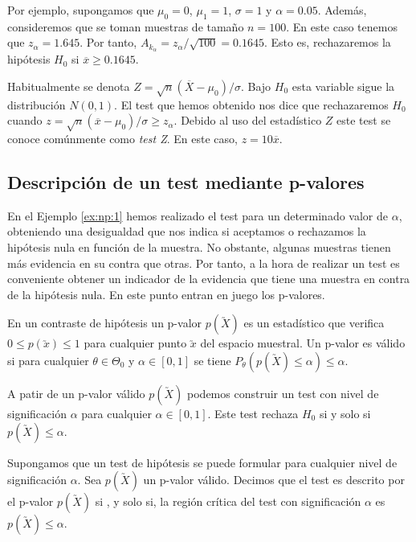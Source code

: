 \begin{ex}
            Por ejemplo, supongamos que $\mu_0 = 0$, $\mu_1 = 1$, $\sigma = 1$ y $\alpha = 0.05$. Además, consideremos que se toman muestras de tamaño $n = 100$. En este caso tenemos que $z_\alpha = 1.645$. Por tanto, $A_{k_\alpha} = z_\alpha / \sqrt{100} = 0.1645$. Esto es, rechazaremos la hipótesis $H_0$ si $\overline{x} \ge 0.1645$.

            Habitualmente se denota $Z = \sqrt{n} (\overline{X} - \mu_0) / \sigma$. Bajo $H_0$ esta variable sigue la distribución $N(0,1)$. El test que hemos obtenido nos dice que rechazaremos $H_0$ cuando $z = \sqrt{n} (\overline{x} - \mu_0) / \sigma \ge z_\alpha$. Debido al uso del estadístico $Z$ este test se conoce comúnmente como \emph{test Z}. En este caso, $z = 10 \overline{x}$.
        \end{ex}


    \subsection{Descripción de un test mediante p-valores}

        En el Ejemplo \ref{ex:np:1} hemos realizado el test para un determinado valor de $\alpha$, obteniendo una desigualdad que nos indica si aceptamos o rechazamos la hipótesis nula en función de la muestra. No obstante, algunas muestras tienen más evidencia en su contra que otras. %
        Por tanto, a la hora de realizar un test es conveniente obtener un indicador de la evidencia que tiene una muestra en contra de la hipótesis nula. En este punto entran en juego los p-valores.

        \begin{definition}
            En un contraste de hipótesis un p-valor $p(\utilde{X})$ es un estadístico que verifica $0 \le p(\utilde{x}) \le 1$ para cualquier punto $\utilde{x}$ del espacio muestral. Un p-valor es válido si para cualquier $\theta \in \Theta_0$ y $\alpha \in [0,1]$ se tiene $P_\theta(p(\utilde{X}) \le \alpha) \le \alpha.$
        \end{definition}

        A patir de un p-valor válido $p(\utilde{X})$ podemos construir un test con nivel de significación $\alpha$ para cualquier $\alpha \in [0,1]$. Este test rechaza $H_0$ si y solo si $p(\utilde{X}) \le \alpha$.

        \begin{definition}
            Supongamos que un test de hipótesis se puede formular para cualquier nivel de significación $\alpha$. Sea $p(\utilde{X})$ un p-valor válido. Decimos que el test es descrito por el p-valor $p(\utilde{X})$ si , y solo si, la región crítica del test con significación $\alpha$ es $p(\utilde{X}) \le \alpha$.
        \end{definition}

